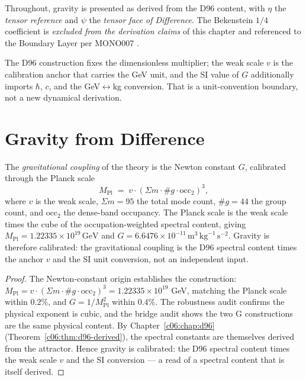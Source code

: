 Throughout, gravity is presented as derived from the D96 content, with $\eta$ the
\emph{tensor reference} and $\psi$ the \emph{tensor face of Difference}. The Bekenstein
$1/4$ coefficient is \emph{excluded from the derivation claims} of this chapter and
referenced to the Boundary Layer per MONO007 \cite{c10:MONO007}.

The D96 construction fixes the dimensionless multiplier; the weak scale $v$ is the
calibration anchor that carries the GeV unit, and the SI value of $G$ additionally imports
$\hbar$, $c$, and the GeV$\leftrightarrow$kg conversion. That is a unit-convention boundary,
not a new dynamical derivation.

\section{Gravity from Difference}
\label{c10:sec:gravity-from-difference}

\begin{theorem}
\label{c10:thm:gravity-derived}
The \emph{gravitational coupling} of the theory is the Newton constant $G$, calibrated
through the Planck scale
\begin{equation}
\label{c10:eq:mpl}
M_{\mathrm{Pl}} \;=\; v\cdot(\Sigma m\cdot\#g\cdot\mathrm{occ}_2)^3,
\end{equation}
where $v$ is the weak scale, $\Sigma m = 95$ the total mode count, $\#g = 44$ the group
count, and $\mathrm{occ}_2$ the dense-band occupancy. The Planck scale is the weak scale
times the cube of the occupation-weighted spectral content, giving
$M_{\mathrm{Pl}} = 1.22335\times10^{19}\,\mathrm{GeV}$ and
$G = 6.6476\times10^{-11}\,\mathrm{m}^3\,\mathrm{kg}^{-1}\,\mathrm{s}^{-2}$. Gravity is
therefore calibrated: the gravitational coupling is the D96 spectral content times the
anchor $v$ and the SI unit conversion, not an independent input.
\end{theorem}

\begin{proof}
The Newton-constant origin \cite{c10:QG181} establishes the construction:
$M_{\mathrm{Pl}} = v\cdot(\Sigma m\cdot\#g\cdot\mathrm{occ}_2)^3 = 1.22335\times10^{19}$
GeV, matching the Planck scale within $0.2\%$, and $G = 1/M_{\mathrm{Pl}}^2$ within
$0.4\%$. The robustness audit \cite{c10:QG183} confirms the physical exponent is cubic, and the
bridge audit \cite{c10:QG182} shows the two G constructions are the same physical content.
By Chapter~\ref{c06:chap:d96} (Theorem~\ref{c06:thm:d96-derived}), the spectral constants are
themselves derived from the attractor. Hence gravity is calibrated:
the D96 spectral content times the weak scale $v$ and the SI conversion --- a read of a
spectral content that is itself derived.
\end{proof}

